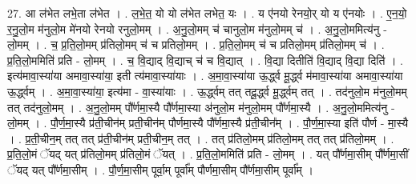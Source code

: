 \documentclass[17pt]{extarticle}
\begin{document}
27. आ ल॑भेत लभे॒ता ल॑भेत । . ल॒भे॒त॒ यो यो ल॑भेत लभेत॒ यः । . य ए॑नयो रेनयो॒र् यो य ए॑नयोः । . ए॒न॒यो॒ र॒नु॒लो॒म म॑नुलो॒म मे॑नयो रेनयो रनुलो॒मम् । . अ॒नु॒लो॒मम् च॑ चानुलो॒म म॑नुलो॒मम् च॑ । . अ॒नु॒लो॒ममित्य॑नु - लो॒मम् । . च॒ प्र॒ति॒लो॒मम् प्र॑तिलो॒मम् च॑ च प्रतिलो॒मम् । . प्र॒ति॒लो॒मम् च॑ च प्रतिलो॒मम् प्र॑तिलो॒मम् च॑ । . प्र॒ति॒लो॒ममिति॑ प्रति - लो॒मम् । . च॒ वि॒द्याद् वि॒द्याच् च॑ च वि॒द्यात् । . वि॒द्या दितीति॑ वि॒द्याद् वि॒द्या दिति॑ । . इत्य॑मावा॒स्या॑या अमावा॒स्या॑या॒ इती त्य॑मावा॒स्या॑याः । . अ॒मा॒वा॒स्या॑या ऊ॒र्द्ध्व मू॒र्द्ध्व म॑मावा॒स्या॑या अमावा॒स्या॑या ऊ॒र्द्ध्वम् । . अ॒मा॒वा॒स्या॑या॒ इत्य॑मा - वा॒स्या॑याः । . ऊ॒र्द्ध्वम् तत् तदू॒र्द्ध्व मू॒र्द्ध्वम् तत् । . तद॑नुलो॒म म॑नुलो॒मम् तत् तद॑नुलो॒मम् । . अ॒नु॒लो॒मम् पौ᳚र्णमा॒स्यै पौ᳚र्णमा॒स्या अ॑नुलो॒म म॑नुलो॒मम् पौ᳚र्णमा॒स्यै । . अ॒नु॒लो॒ममित्य॑नु - लो॒मम् । . पौ॒र्ण॒मा॒स्यै प्र॑ती॒चीन॑म् प्रती॒चीन॑म् पौर्णमा॒स्यै पौ᳚र्णमा॒स्यै प्र॑ती॒चीन᳚म् । . पौ॒र्ण॒मा॒स्या इति॑ पौर्ण - मा॒स्यै । . प्र॒ती॒चीन॒म् तत् तत् प्र॑ती॒चीन॑म् प्रती॒चीन॒म् तत् । . तत् प्र॑तिलो॒मम् प्र॑तिलो॒मम् तत् तत् प्र॑तिलो॒मम् । . प्र॒ति॒लो॒मं ॅयद् यत् प्र॑तिलो॒मम् प्र॑तिलो॒मं ॅयत् । . प्र॒ति॒लो॒ममिति॑ प्रति - लो॒मम् । . यत् पौ᳚र्णमा॒सीम् पौ᳚र्णमा॒सीं ॅयद् यत् पौ᳚र्णमा॒सीम् । . पौ॒र्ण॒मा॒सीम् पूर्वा॒म् पूर्वा᳚म् पौर्णमा॒सीम् पौ᳚र्णमा॒सीम् पूर्वा᳚म् । \newline
\end{document}
